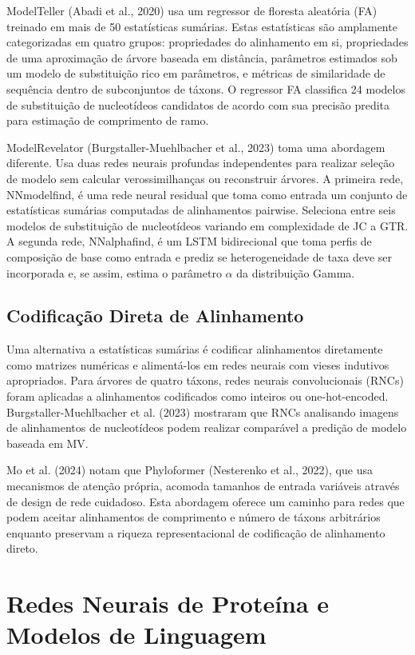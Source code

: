 ModelTeller (Abadi et al., 2020) usa um regressor de floresta aleatória (FA) treinado em mais de 50 estatísticas sumárias. Estas estatísticas são amplamente categorizadas em quatro grupos: propriedades do alinhamento em si, propriedades de uma aproximação de árvore baseada em distância, parâmetros estimados sob um modelo de substituição rico em parâmetros, e métricas de similaridade de sequência dentro de subconjuntos de táxons. O regressor FA classifica 24 modelos de substituição de nucleotídeos candidatos de acordo com sua precisão predita para estimação de comprimento de ramo.

ModelRevelator (Burgstaller-Muehlbacher et al., 2023) toma uma abordagem diferente. Usa duas redes neurais profundas independentes para realizar seleção de modelo sem calcular verossimilhanças ou reconstruir árvores. A primeira rede, NNmodelfind, é uma rede neural residual que toma como entrada um conjunto de estatísticas sumárias computadas de alinhamentos pairwise. Seleciona entre seis modelos de substituição de nucleotídeos variando em complexidade de JC a GTR. A segunda rede, NNalphafind, é um LSTM bidirecional que toma perfis de composição de base como entrada e prediz se heterogeneidade de taxa deve ser incorporada e, se assim, estima o parâmetro $\alpha$ da distribuição Gamma.

\subsection{Codificação Direta de Alinhamento}

Uma alternativa a estatísticas sumárias é codificar alinhamentos diretamente como matrizes numéricas e alimentá-los em redes neurais com vieses indutivos apropriados. Para árvores de quatro táxons, redes neurais convolucionais (RNCs) foram aplicadas a alinhamentos codificados como inteiros ou one-hot-encoded. Burgstaller-Muehlbacher et al. (2023) mostraram que RNCs analisando imagens de alinhamentos de nucleotídeos podem realizar comparável a predição de modelo baseada em MV.

Mo et al. (2024) notam que Phyloformer (Nesterenko et al., 2022), que usa mecanismos de atenção própria, acomoda tamanhos de entrada variáveis através de design de rede cuidadoso. Esta abordagem oferece um caminho para redes que podem aceitar alinhamentos de comprimento e número de táxons arbitrários enquanto preservam a riqueza representacional de codificação de alinhamento direto.

\section{Redes Neurais de Proteína e Modelos de Linguagem}

